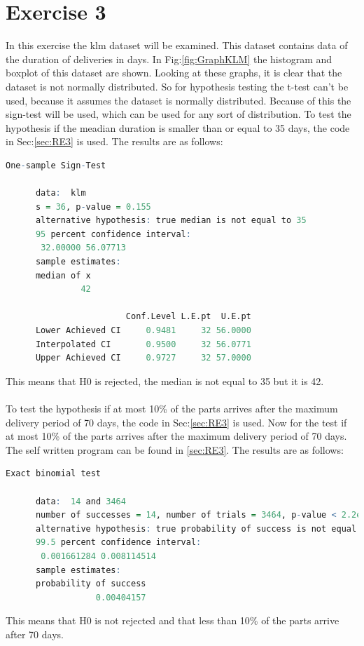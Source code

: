 \documentclass{article}
\begin{document}
  \section{Exercise 3}
    In this exercise the klm dataset will be examined.
    This dataset contains data of the duration of deliveries in days.
    In Fig:\ref{fig:GraphKLM} the histogram and boxplot of this dataset are shown.
    Looking at these graphs, it is clear that the dataset is not normally distributed.
    So for hypothesis testing the t-test can't be used, because it assumes the dataset is normally distributed.
    Because of this the sign-test will be used, which can be used for any sort of distribution.
    To test the hypothesis if the meadian duration is smaller than or equal to 35 days,
    the code in Sec:\ref{sec:RE3} is used.
    The results are as follows:\\
    \begin{lstlisting}[language=R]
        One-sample Sign-Test

      data:  klm
      s = 36, p-value = 0.155
      alternative hypothesis: true median is not equal to 35
      95 percent confidence interval:
       32.00000 56.07713
      sample estimates:
      median of x 
               42 

                        Conf.Level L.E.pt  U.E.pt
      Lower Achieved CI     0.9481     32 56.0000
      Interpolated CI       0.9500     32 56.0771
      Upper Achieved CI     0.9727     32 57.0000
    \end{lstlisting}
    This means that H0 is rejected, the median is not equal to 35 but it is 42.\\\\
    To test the hypothesis if at most 10\% of the parts arrives after the maximum delivery period of 70 days,
    the code in Sec:\ref{sec:RE3} is used.
    Now for the test if at most 10\% of the parts arrives after the maximum delivery period of 70 days.
    The self written program can be found in \ref{sec:RE3}.
    The results are as follows:\\
    \begin{lstlisting}[language=R]
        Exact binomial test

      data:  14 and 3464
      number of successes = 14, number of trials = 3464, p-value < 2.2e-16
      alternative hypothesis: true probability of success is not equal to 0.5
      99.5 percent confidence interval:
       0.001661284 0.008114514
      sample estimates:
      probability of success 
                  0.00404157 
    \end{lstlisting}
    This means that H0 is not rejected and that less than 10\% of the parts arrive after 70 days.
\end{document}
